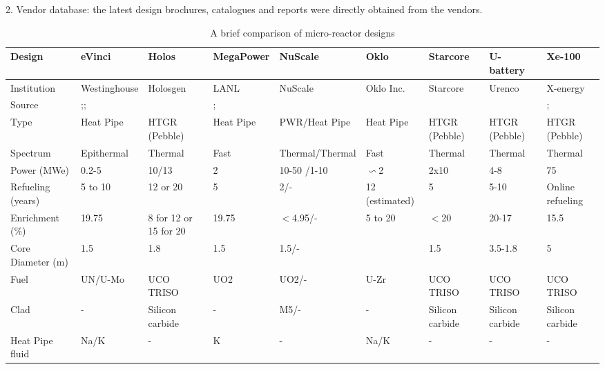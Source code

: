 \documentclass[10pt,a4paper]{article}
\begin{document}
2. Vendor database: the latest design brochures, catalogues and reports were directly obtained from the vendors.

\pagebreak
{}
\begin{landscape}
\begin{table} [ht]
\begin{center}

\caption{A brief comparison of micro-reactor designs}
\label{microreactors}
\begin{tabular}{|l|l|l|l|l|l|l|l|l|}
\hline 
Design 		&eVinci 		& Holos		&MegaPower 	& NuScale		& Oklo 		& Starcore		& U-battery 		& Xe-100 \\ 
\hline 
Institution 	&Westinghouse& Holosgen	&LANL	& NuScale		& Oklo Inc. 	& Starcore		& Urenco 		& X-energy \\ 
Source 	&\cite{Levinsky18};\cite{Yan20};\cite{Arafat19}  &\cite{holos17}  	& \cite{mega15};\cite{mega17}	& \cite{NuChapter4} 		& \cite{Oklofsar} 	&\cite{starwebsite} 		&\cite{Ubattery}  		&\cite{IAEA18};\cite{xmeeting} \\ 
Type			&Heat Pipe	& HTGR (Pebble)	  	& Heat Pipe 		& PWR/Heat Pipe&Heat Pipe   			&	HTGR (Pebble)			& HTGR (Pebble)	& HTGR (Pebble)\\ 
Spectrum		&Epithermal	& Thermal 		 	&Fast  	&Thermal/Thermal 		&Fast   			& Thermal  			&	Thermal		&Thermal\\ 
Power (MWe)	&0.2-5		& 10/13  			&2			& 10-50 /1-10			& $\backsim$2  			&2x10  			&4-8			&75\\ 
Refueling (years)&5 to 10		&12 or 20   			&	5		& 2/- 			& 12 (estimated)  			&5  			&5-10 			&Online refueling\\ 
Enrichment (\%)&19.75		&8 for 12 or 15 for 20   			&19.75			& $<$4.95/- 		&  5 to 20 			&$<$20	  			&20-17			&15.5\\ 
Core  Diameter (m)	&1.5		& 1.8  			&1.5			& 1.5/- 		&   			&1.5   			&3.5-1.8			& 5\\ 
Fuel			&UN/U-Mo	& UCO TRISO  			&	UO2		&UO2/-		&  U-Zr 			& UCO TRISO  			&UCO TRISO			&UCO TRISO\\ 
Clad			&-		&  Silicon carbide 			&	-		& M5/- 		&   -			&Silicon carbide   			&Silicon carbide			&Silicon carbide\\ 
Heat Pipe fluid	&Na/K	& -  			&K			& - 		& Na/K 			&  - 			&	-		&-\\ 
\hline
\end{tabular}


\end{center}
\end{table}
\end{landscape}
\end{document}
